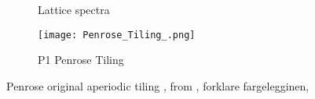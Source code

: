 


\begin{figure}[h!]%
    \centering
    \begin{subfigure}{.47\textwidth}
        \centering
        \caption{Lattice spectra}
        \label{fig:tiling_one}
    \end{subfigure}\quad
    \begin{subfigure}{.47\textwidth}
        \centering
        \texttt{[image: Penrose\_Tiling\_.png]}
        \caption{P1 Penrose Tiling}
        \label{fig:tiling_two}
    \end{subfigure}
    \caption{Penrose original aperiodic tiling \cite{penrosePentaplexityClassNonPeriodic1979}, from \cite{inductiveloadP1TilingUsing}, forklare fargelegginen, }
    \label{fig:tilingsss}
\end{figure}
